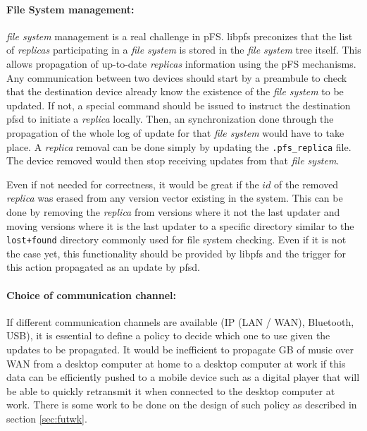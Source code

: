 \paragraph {File System management:}
\emph{file system} management is a real challenge in pFS. libpfs
preconizes that the list of \emph{replicas} participating in a
\emph{file system} is stored in the \emph{file system} tree
itself. This allows propagation of up-to-date \emph{replicas} information
using the pFS mechanisms. Any communication between two
devices should start by a preambule to check that the
destination device already know the existence of the
\emph{file system} to be updated. If not, a special command should be
issued to instruct the destination pfsd to initiate a \emph{replica}
locally. Then, an synchronization done through the propagation
of the whole log of update for that \emph{file system} would have to
take place. A \emph{replica} removal can be done simply by updating
the {\tt .pfs\_replica} file. The device removed would then
stop receiving updates from that \emph{file system}.

Even if not needed for correctness, it would be great if the $id$ of
the removed \emph{replica} was erased from any version vector existing
in the system. This can be done by removing the \emph{replica} from
versions where it not the last updater and moving versions where it is
the last updater to a specific directory similar to the {\tt
  lost+found} directory commonly used for file system
checking. Even if it is not the case yet, this functionality should be
provided by libpfs and the trigger for this action propagated as an
update by pfsd.

\paragraph {Choice of communication channel:}
If different communication channels are available (IP (LAN / WAN),
Bluetooth, USB), it is essential to define a policy to decide which
one to use given the updates to be propagated. It would be inefficient
to propagate GB of music over WAN from a desktop computer at home to a
desktop computer at work if this data can be efficiently pushed to a
mobile device such as a digital player that will be able to quickly
retransmit it when connected to the desktop computer at work. There is
some work to be done on the design of such policy as described in
section \ref{sec:futwk}.


